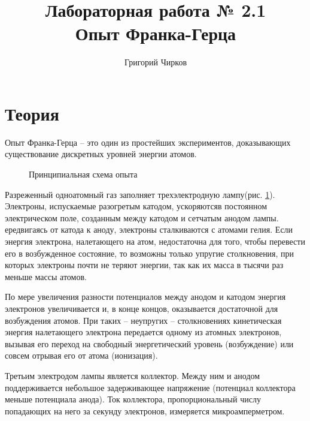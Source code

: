 \documentclass[12pt,a4paper]{article}
\author{Григорий Чирков}
\title{Лабораторная работа № 2.1 \\
		 Опыт Франка-Герца}
\begin{document}
\maketitle

\section{Теория}
Опыт Франка-Герца -- это один из простейших экспериментов, доказывающих существование дискретных уровней энергии атомов.

\begin{figure} \label{scheme} 
\vspace{-5ex}  
\caption{Принципиальная схема опыта}
\end{figure}

Разреженный одноатомный газ заполняет трехэлектродную лампу(рис. \ref{scheme}).  Электроны, испускаемые разогретым катодом, ускоряютсяв постоянном электрическом поле, созданным между катодом и сетчатым анодом лампы. ередвигаясь от катода к аноду, электроны сталкиваются с атомами гелия. Если энергия электрона, налетающего на атом, недостаточна для того, чтобы перевести его в возбужденное состояние, то возможны только упругие столкновения, при которых электроны почти не теряют энергии, так как их масса в тысячи раз меньше массы атомов. 


По мере увеличения разности потенциалов между анодом и катодом энергия электронов увеличивается и, в конце концов, оказывается достаточной для возбуждения атомов. При таких -- неупругих -- столкновениях кинетическая энергия налетающего электрона передается одному из атомных электронов, вызывая его переход на свободный энергетический уровень (возбуждение) или совсем отрывая его от атома (ионизация).

Третьим электродом лампы является коллектор. Между ним и анодом поддерживается небольшое задерживающее напряжение (потенциал коллектора меньше потенциала анода). Ток коллектора, пропорциональный числу попадающих на него за секунду электронов, измеряется микроамперметром.
\end{document}
